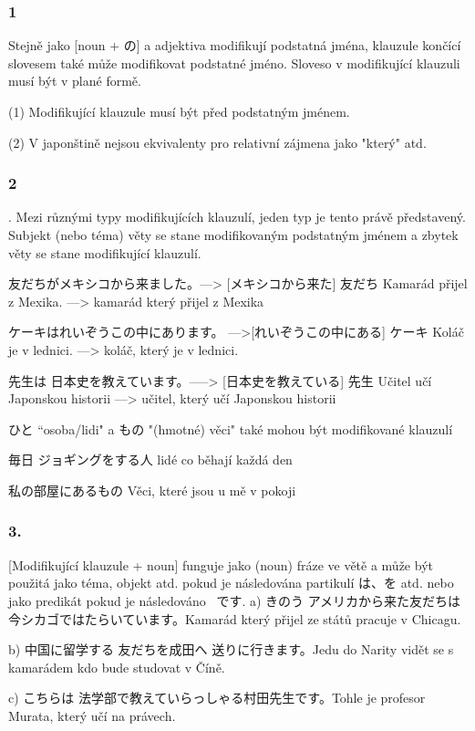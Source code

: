 \subsubsection{1}
Stejně jako [noun + の] a adjektiva modifikují podstatná jména, klauzule končící slovesem také může modifikovat podstatné jméno. Sloveso v modifikující klauzuli musí být v plané formě. 

(1) Modifikující klauzule musí být před podstatným jménem.

(2) V japonštině nejsou ekvivalenty pro relativní zájmena jako "který" atd. 

\subsubsection{2}.
Mezi různými typy modifikujících klauzulí, jeden typ je tento právě představený. Subjekt (nebo téma) věty se stane modifikovaným podstatným jménem a zbytek věty se stane modifikující klauzulí.

友だちがメキシコから来ました。---> [メキシコから来た] 友だち
Kamarád přijel z Mexika.  ––> kamarád který přijel z Mexika

ケーキはれいぞうこの中にあります。 ––>[れいぞうこの中にある] ケーキ
Koláč je v lednici. ––> koláč, který je v lednici.


先生は 日本史を教えています。–––> [日本史を教えている] 先生
Učitel učí Japonskou historii ––> učitel, který učí Japonskou historii



ひと “osoba/lidi" a もの "(hmotné) věci" také mohou být modifikované klauzulí

毎日 ジョギングをする人 lidé co běhají každá den

私の部屋にあるもの Věci, které jsou u mě v pokoji


\subsubsection{3.}
 [Modifikující klauzule + noun] funguje jako (noun) fráze ve větě a může být použitá jako téma, objekt atd. pokud je následována partikulí は、を atd. nebo jako predikát pokud je následováno  ~です.
a) きのう アメリカから来た友だちは今シカゴではたらいています。Kamarád který přijel ze států pracuje v Chicagu.


b) 中国に留学する 友だちを成田へ 送りに行きます。Jedu do Narity vidět se s kamarádem kdo bude studovat v Číně.

c) こちらは 法学部で教えていらっしゃる村田先生です。Tohle je profesor Murata, který učí na právech.

